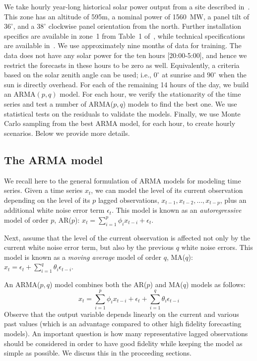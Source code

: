 \documentclass[11pt]{article} %
\begin{document}
We take hourly year-long historical solar power output 
from a site described in~\cite{golestaneh2016generation}. 
This zone has an altitude of 595m, a nominal power of 1560~MW, a panel 
tilt 
of $36^\circ$, and a $38^\circ$ clockwise panel orientation from the north. 
Further installation specifics are available in zone~1 from Table~1 
of~\cite{golestaneh2016generation}, while technical specifications are 
available 
in~\cite{technical}.  We use approximately nine months of data 
for training. The data does not have any solar power for the ten hours 
[20:00-5:00], and hence we restrict the forecasts in these hours to be zero as 
well. Equivalently, a criteria based on the solar zenith angle can be used; 
i.e., $0^\circ$ at sunrise and $90^\circ$ when the sun is directly overhead. 
For 
each of the remaining 14 hours of the day, we build an ARMA$(p,q)$ 
model. 
For each hour, we verify the stationarity of the time 
series and test a number of ARMA($p,q$) models to find the best 
one. We use statistical tests on the residuals to validate the models. Finally, 
we use Monte Carlo sampling from the best ARMA model, for each hour, to create 
hourly scenarios. Below we provide more details.

\subsection{The ARMA model} \label{sec:arma}

We recall here to the general formulation of  ARMA models for modeling time 
series.  Given a time series $x_t$, we can model the level of its current 
observation depending on the level of its $p$ lagged observations, 
$x_{t-1},x_{t-2}, \ldots, x_{t-p}$, plus an additional white noise error term 
$\epsilon_t$. This model is known as an \textit{autoregressive} model of order 
${p}$, AR($p$): $x_t = \sum_{i=1}^p  \phi_i x_{t-i}   + \epsilon_t$.

Next, assume that the level of the current observation is affected not only 
by the current white noise error term, but also by the previous 
$q$ white noise errors. This model is known as a \textit{moving average} 
model of order $q$, MA($q$): $x_t = \epsilon_t + \sum_{i=1}^q  \theta_i \epsilon_{t-i}$.

An ARMA($p,q$) model combines both the AR($p$) and MA($q$) models as follows:
\begin{equation}\label{eq3}
x_t =  \sum_{i=1}^p  \phi_i x_{t-i}    + \epsilon_t + \sum_{i=1}^q  \theta_i \epsilon_{t-i}   
\end{equation}
Observe that the output variable depends linearly on the current and various 
past values (which is an advantage compared to other high fidelity 
forecasting models). An important question is how many 
representative lagged observations should be considered in order to have good 
fidelity while keeping the model as simple as possible. We discuss this in the 
proceeding sections.
\end{document}
